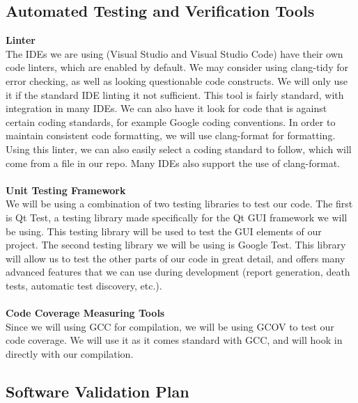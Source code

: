 \documentclass[12pt, titlepage]{article}
\begin{document}
\subsection{Automated Testing and Verification Tools}
\textbf{Linter}\\
The IDEs we are using (Visual Studio and Visual Studio Code) have their own code linters, which are enabled by default.
We may consider using clang-tidy for error checking, as well as looking questionable code constructs. We will only use it if the standard IDE linting it not sufficient. This tool is fairly standard, with integration in many IDEs. We can also have it look for code that is against certain coding standards, for example Google coding conventions. In order to maintain consistent code formatting, we will use clang-format for formatting. Using this linter, we can also easily select a coding standard to follow, which will come from a file in our repo. Many IDEs also support the use of clang-format.\\\\
\textbf{Unit Testing Framework}\\
We will be using a combination of two testing libraries to test our code. The first is Qt Test, a testing library made specifically for the Qt GUI framework we will be using. This testing library will be used to test the GUI elements of our project.
The second testing library we will be using is Google Test. This library will allow us to test the other parts of our code in great detail, and offers many advanced features that we can use during development (report generation, death tests, automatic test discovery, etc.).\\\\
\textbf{Code Coverage Measuring Tools}\\
Since we will using GCC for compilation, we will be using GCOV to test our code coverage. We will use it as
it comes standard with GCC, and will hook in directly with our compilation.




\subsection{Software Validation Plan}
\end{document}
